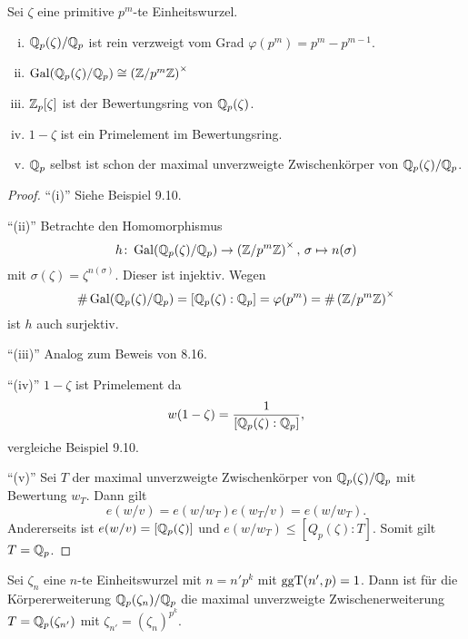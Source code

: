 

\begin{Prop}
	Sei $\zeta$ eine primitive $p^m$-te Einheitswurzel.
	\begin{enumerate}[(i)]
		\item $\mathbb{Q}_p(\zeta)/\mathbb{Q}_p$ ist rein verzweigt vom Grad $\varphi(p^m) = p^m - p^{m-1}$.
		\item $\operatorname{Gal} (\mathbb{Q}_p(\zeta)/\mathbb{Q}_p) \cong \left( \mathbb{Z} / p^m \mathbb{Z} \right)^\times$
		\item $\mathbb{Z}_p[\zeta]$ ist der Bewertungsring von $\mathbb{Q}_p(\zeta)$.
		\item $1-\zeta$ ist ein Primelement im Bewertungsring.
		\item $\mathbb{Q}_p$ selbst ist schon der maximal unverzweigte Zwischenkörper von $\mathbb{Q}_p(\zeta) / \mathbb{Q}_p$.
	\end{enumerate}
\end{Prop}


\begin{proof}
	\enquote{(i)} Siehe Beispiel 9.10.
	
	\bigskip \enquote{(ii)} Betrachte den Homomorphismus
	\[ h \colon \operatorname{Gal} (\mathbb{Q}_p(\zeta)/\mathbb{Q}_p) \to \left( \mathbb{Z} / p^m \mathbb{Z} \right)^\times, \, \sigma \mapsto n(\sigma)
	\]
	mit $\sigma(\zeta) = \zeta^{n(\sigma)}$. Dieser ist injektiv. Wegen
	\[ \# \operatorname{Gal} (\mathbb{Q}_p(\zeta)/\mathbb{Q}_p) = [\mathbb{Q}_p(\zeta):\mathbb{Q}_p] 
	=\varphi(p^m) = \# \left( \mathbb{Z} / p^m \mathbb{Z} \right)^\times
	\]
	ist $h$ auch surjektiv.
	
	\bigskip \enquote{(iii)} Analog zum Beweis von 8.16.
	
	\bigskip \enquote{(iv)} $1-\zeta$ ist Primelement da
	\[ w(1-\zeta) = \frac{1}{[\mathbb{Q}_p(\zeta):\mathbb{Q}_p]},
	\]
	vergleiche Beispiel 9.10.
	
	\bigskip \enquote{(v)} Sei $T$ der maximal unverzweigte Zwischenkörper von $\mathbb{Q}_p(\zeta) / \mathbb{Q}_p$ mit Bewertung $w_T$. Dann gilt
	\[ e(w/v) = e(w/w_T)e(w_T/v)=e(w/w_T).
	\]
	Andererseits ist $e(w/v) = [\mathbb{Q}_p(\zeta)]$ und $e(w/w_T) \leq [Q_p(\zeta):T]$.
	Somit gilt $T=\mathbb{Q}_p$.
\end{proof}


\begin{Bsp}
	Sei $\zeta_n$ eine $n$-te Einheitswurzel mit $n=n'p^k$ mit $\operatorname{ggT}(n',p) = 1$.
	Dann ist für die Körpererweiterung $\mathbb{Q}_p(\zeta_n) / \mathbb{Q}_p$ die maximal unverzweigte Zwischenerweiterung $T=\mathbb{Q}_p(\zeta_{n'})$ mit $\zeta_{n'} = (\zeta_n)^{p^k}$.
\end{Bsp}

